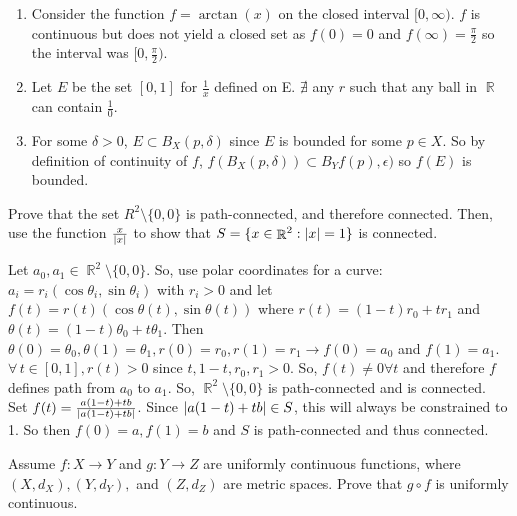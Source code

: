 \documentclass[12pt,letterpaper,boxed]{hmcpset}
\DeclareMathOperator{\R}{\mathbb{R}}
\DeclarePairedDelimiter\abs{\lvert}{\rvert}%
\begin{document}
\begin{solution}
\begin{enumerate}
    \itemsep0em
    \item Consider the function $f = \arctan(x)$ on the closed interval $[0, \infty)$. $f$ is continuous but does not yield a closed set as $f(0)=0$ and $f(\infty)=\frac{\pi}{2}$ so the interval was $[0, \frac{\pi}{2})$.
    \item Let $E$ be the set $[0, 1]$ for $\frac{1}{x}$ defined on E. $\nexists$ any $r$ such that any ball in $\R$ can contain $\frac{1}{0}$.
    \item For some $\delta > 0$, $E\subset B_X(p, \delta)$ since $E$ is bounded for some $p\in X$. So by definition of continuity of $f$, $f(B_X(p, \delta))\subset B_Yf(p), \epsilon)$ so $f(E)$ is bounded.
\end{enumerate} 
\end{solution}

\begin{problem}[Exercise 2.32]
Prove that the set $R^{2}\setminus\{0,0\}$ is path-connected, and therefore connected. Then, use the function $\frac{x}{\abs{x}}$ to show that $S = \{x\in\R^{2}:\abs{x} = 1\}$ is connected.
\end{problem}

\begin{solution}
Let $a_0, a_1 \in \R^{2}\setminus\{0,0\}$. So, use polar coordinates for a curve: $a_i = r_i(\cos \theta_i, \sin \theta_i)$ with $r_i > 0$ and let $f(t) = r(t)(\cos \theta(t), \sin \theta(t))$ where $r(t) = (1 - t)r_0 + tr_1$ and $\theta(t)=(1-t)\theta_0 + t\theta_1$.
Then $\theta(0) = \theta_0, \theta(1)=\theta_1, r(0) = r_0, r(1)=r_1 \rightarrow f(0)=a_0$ and $f(1) = a_1$. $\forall \, t\in [0,1], r(t) > 0$ since $t, 1-t, r_0, r_1 > 0$. So, $f(t)\neq 0 \forall t$ and therefore $f$ defines path from $a_0$ to $a_1$. So, $\R^{2}\setminus\{0,0\}$ is path-connected and is connected. \\
Set $f(t)= \frac{a(1 - t) + tb}{\abs{a(1 - t) + tb}}$. Since $\abs{a(1 - t) + tb} \in S$, this will always be constrained to 1. So then $f(0) = a, f(1) = b$ and $S$ is path-connected and thus connected.
\end{solution}

\begin{problem}[Exercise 2.40]
Assume $f: X \rightarrow Y$ and $g: Y \rightarrow Z$ are uniformly continuous functions, where $(X, d_X), (Y, d_Y),$ and $(Z, d_Z)$ are metric spaces. Prove that $g \circ f$ is uniformly continuous.
\end{problem}
\end{document}

